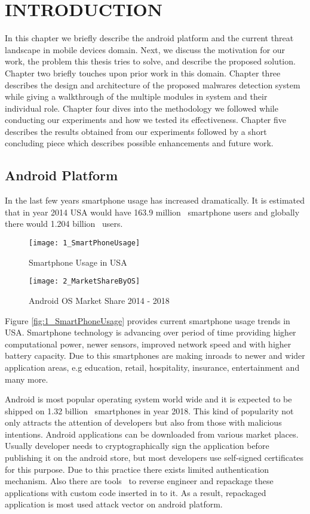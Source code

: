 \chapter{INTRODUCTION}
\thispagestyle{plain}

\label{Introduction}

In this chapter we briefly describe the android platform and the current threat landscape in mobile devices domain. Next, we discuss the motivation for our work, the problem this thesis tries to solve, and describe the proposed solution. Chapter two briefly touches upon prior work in this domain. Chapter three describes the design and architecture of the proposed malwares detection system while giving a walkthrough of the multiple modules in system and their individual role. Chapter four dives into the methodology we followed while conducting our experiments and how we tested its effectiveness. Chapter five describes the results obtained from our experiments followed by a short concluding piece which describes possible enhancements and future work.

\section{Android Platform}

In the last few years smartphone usage has increased dramatically. It is estimated that in year 2014 USA would have 163.9 million~\cite{26} smartphone users and globally there would 1.204 billion~\cite{27} users. 
\begin{figure}[htp]
\centering
\texttt{[image: 1\_SmartPhoneUsage]}
\caption{Smartphone Usage in USA}
\label{fig:1_SmartPhoneUsage}
\quad
\texttt{[image: 2\_MarketShareByOS]}
\caption{Android OS Market Share 2014 - 2018}
\label{fig:2_MarketShareByOS}
\end{figure}

Figure \ref{fig:1_SmartPhoneUsage} provides current smartphone usage trends in USA. Smartphone technology is advancing over period of time providing higher computational power, newer sensors, improved network speed and with higher battery capacity. Due to this  smartphones are making inroads to newer and wider application areas, e.g education, retail, hospitality, insurance, entertainment and many more. 

Android is most popular operating system world wide and it is expected to be shipped on 1.32 billion~\cite{27} smartphones in year 2018. This kind of popularity not only attracts the attention of developers but also from those with malicious intentions. Android applications can be downloaded from various market places. Usually developer needs to cryptographically sign the application before publishing it on the android store, but most developers use self-signed certificates for this purpose. Due to this practice there exists limited authentication mechanism. Also there are tools~\cite{28} to reverse engineer and repackage these applications with custom code inserted in to it. As a result, repackaged application is most used attack vector on android platform. 

